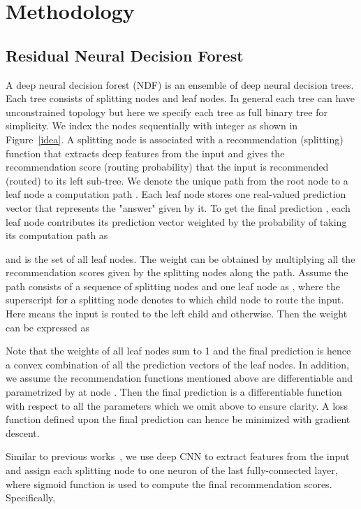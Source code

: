 \documentclass{bmvc2k}
\begin{document}
\section{Methodology}
\subsection{Residual Neural Decision Forest}
A deep neural decision forest (NDF) is an ensemble of deep neural decision trees. Each tree consists of splitting nodes and leaf nodes. In general each tree can have unconstrained topology but here we specify each tree as full binary tree for simplicity. We index the nodes sequentially with integer  as shown in Figure~\ref{idea}. A splitting node  is associated with a recommendation (splitting) function  that extracts deep features from the input  and gives the recommendation score (routing probability)  that the input is recommended (routed) to its left sub-tree. We denote the unique path from the root node to a leaf node  a computation path . Each leaf node stores one real-valued prediction vector  that represents the "answer" given by it. To get the final prediction , each leaf node contributes its prediction vector weighted by the probability of taking its computation path as  

and  is the set of all leaf nodes.
The weight can be obtained by multiplying all the recommendation scores given by the splitting nodes along the path. Assume the path  consists of a sequence of  splitting nodes and one leaf node as , where the superscript for a splitting node denotes to which child node to route the input. Here  means the input is routed to the left child and  otherwise. Then the weight can be expressed as
 

Note that the weights of all leaf nodes sum to 1 and the final prediction is hence a convex combination of all the prediction vectors of the leaf nodes. In addition, we assume the recommendation functions mentioned above are differentiable and parametrized by  at node . Then the final prediction is a differentiable function with respect to all the parameters which we omit above to ensure clarity. A loss function defined upon the final prediction can hence be minimized with gradient descent.

Similar to previous works~\cite{NDF, DRFs}, we use deep CNN to extract features from the input and assign each splitting node to one neuron of the last fully-connected layer, where sigmoid function is used to compute the final recommendation scores. Specifically,
\end{document}
